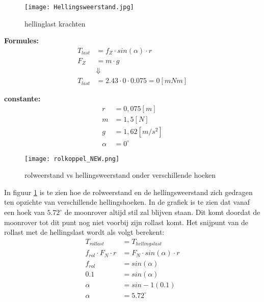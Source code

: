     \begin{figure}[H]
        \centering
        \texttt{[image: Hellingsweerstand.jpg]}
        \caption{hellinglast krachten}
    \end{figure}

    \begin{multicols}{2}
        \textbf{Formules:}
        \begin{equation}
            \begin{split}
                T_{last} &= f_{Z} \cdot sin(\alpha) \cdot r \\
                F_{Z} &= m \cdot g\\
                &\Downarrow \\
                T_{last} &= 2.43 \cdot 0 \cdot 0.075 = 0 [mNm]
            \end{split}
        \end{equation}

        \textbf{constante:}
        \begin{equation*}
            \begin{split}
                r &= 0,075 [m] \\
                m &= 1,5 [N] \\
                g &= 1,62 [m/s^2] \\
                \alpha &= 0^\circ 
            \end{split}
        \end{equation*}
    \end{multicols}

    \begin{figure}[H]
        \centering
        \texttt{[image: rolkoppel\_NEW.png]}
        \caption{rolweerstand vs hellingsweerstand onder verschillende hoeken}
        \label{fig:birds}
    \end{figure}

    In figuur \ref{fig:birds} is te zien hoe de rolweerstand en de hellingsweerstand zich gedragen ten opzichte van verschillende hellingshoeken. In de grafiek is te zien dat vanaf een hoek van $5.72^\circ$ de moonrover altijd stil zal blijven staan. Dit komt doordat de moonrover tot dit punt nog niet voorbij zijn rollast komt. Het snijpunt van de rollast met de hellingslast wordt als volgt berekent:
    \begin{equation}
        \begin{split}
            T_{rollast} &= T_{hellingslast} \\
            f_{rol} \cdot F_{N} \cdot r &= F_{N} \cdot sin(\alpha) \cdot r \\
            f_{rol} &= sin(\alpha) \\
            0.1 &= sin(\alpha) \\
            \alpha &= sin-1(0.1) \\
            \alpha &= 5.72^\circ
        \end{split}
    \end{equation}

